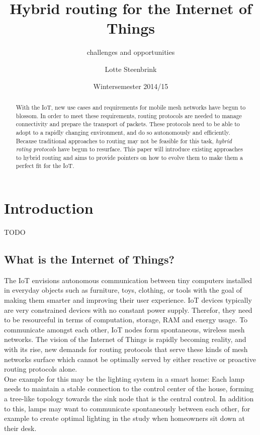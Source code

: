 \documentclass[a4paper,10pt]{scrartcl}
\begin{document}
\title{Hybrid routing for the Internet of Things}
\subtitle{challenges and opportunities}
\author{Lotte Steenbrink}
\date{Wintersemester 2014/15}
\maketitle

\begin{abstract}
With the \gls{IoT}, new use cases and requirements for mobile mesh networks have begun to blossom. In order to meet these requirements, routing protocols are needed to manage connectivity and prepare the transport of packets. These protocols need to be able to adopt to a rapidly changing environment, and do so autonomously and efficiently. Because traditional approaches to routing may not be feasible for this task, \emph{hybrid roting protocols} have begun to resurface. This paper will introduce existing approaches to hybrid routing and aims to provide pointers on how to evolve them to make them a perfect fit for the IoT.

\end{abstract}

\section{Introduction}
\label{sec:Intro}
TODO


\subsection{What is the Internet of Things?}
\label{subsec:IoT}
The \gls{IoT} envisions autonomous communication between tiny computers installed in everyday objects such as furniture, toys, clothing, or tools with the goal of making them smarter and improving their user experience. IoT devices typically are very constrained devices with no constant power supply. Therefor, they need to be resourceful in terms of computation, storage, RAM and energy usage.
To communicate amongst each other, IoT nodes form spontaneous, wireless mesh networks.
The vision of the Internet of Things is rapidly becoming reality, and with its rise, new demands for routing protocols that serve these kinds of mesh networks surface which cannot be optimally served by either reactive or proactive routing protocols alone.\\
One example for this may be the lighting system in a smart home: Each lamp needs to maintain a stable connection to the control center of the house, forming a tree-like topology towards the sink node that is the central control. In addition to this, lamps may want to communicate spontaneously between each other, for example to create optimal lighting in the study when homeowners sit down at their desk.
\end{document}
